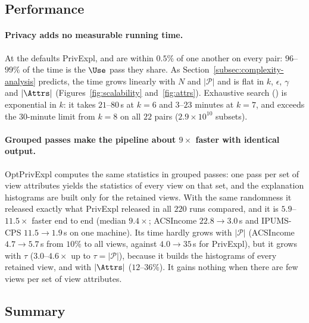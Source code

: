 \subsection{Performance}
\label{subsec:scalability}
\paragraph{Privacy adds no measurable running time.}
At the defaults \textsf{PrivExpl}, \Bone{} and \Bthree{} are within $0.5\%$ of one another on every pair: $96$--$99\%$ of the time is the $\Use$ pass they share.
As Section~\ref{subsec:complexity-analysis} predicts, the time grows linearly with $N$ and $|\mathcal{P}|$ and is flat in $k$, $\epsilon$, $\gamma$ and $|\Attrs|$ (Figures~\ref{fig:scalability} and~\ref{fig:attrs}).
Exhaustive search (\Btwo{}) is exponential in $k$: it takes $21$--$80$\,s at $k=6$ and $3$--$23$ minutes at $k=7$, and exceeds the $30$-minute limit from $k=8$ on all $22$ pairs ($2.9\times10^{10}$ subsets).

\paragraph{Grouped passes make the pipeline about $9\times$ faster with identical output.}
\textsf{OptPrivExpl} computes the same statistics in grouped passes: one pass per set of view attributes yields the statistics of every view on that set, and the explanation histograms are built only for the retained views.
With the same randomness it released exactly what \textsf{PrivExpl} released in all $220$ runs compared, and it is $5.9$--$11.5\times$ faster end to end (median $9.4\times$; ACSIncome $22.8\rightarrow3.0$\,s and IPUMS-CPS $11.5\rightarrow1.9$\,s on one machine).
Its time hardly grows with $|\mathcal{P}|$ (ACSIncome $4.7\rightarrow5.7$\,s from $10\%$ to all views, against $4.0\rightarrow35$\,s for \textsf{PrivExpl}), but it grows with $\tau$ ($3.0$--$4.6\times$ up to $\tau=|\mathcal{P}|$), because it builds the histograms of every retained view, and with $|\Attrs|$ ($12$--$36\%$).
It gains nothing when there are few views per set of view attributes.

\subsection{Summary}
\label{subsec:experiments-summary}

